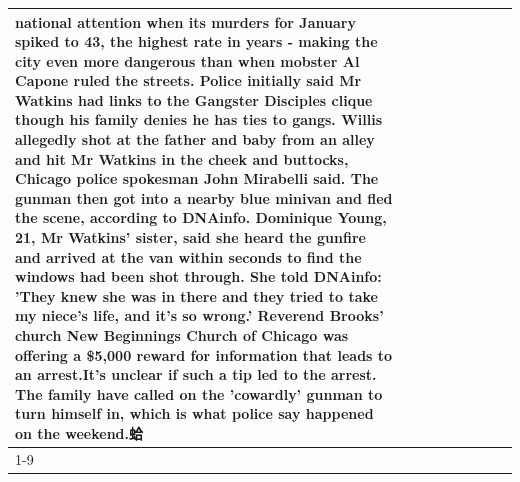 \begin{table}[H]
\begin{tabular}{lllrlllll}
national attention when its murders for January spiked to 43, the highest rate in years - making the city even more dangerous than when mobster Al Capone ruled the streets. Police initially said Mr Watkins had links to the Gangster Disciples clique though his family denies he has ties to gangs. Willis allegedly shot at the father and baby from an alley and hit Mr Watkins in the cheek and buttocks, Chicago police spokesman John Mirabelli said. The gunman then got into a nearby blue minivan and fled the scene, according to DNAinfo. Dominique Young, 21, Mr Watkins' sister, said she heard the gunfire and arrived at the van within seconds to find the windows had been shot through. She told DNAinfo: 'They knew she was in there and they tried to take my niece's life, and it's so wrong.' Reverend Brooks' church New Beginnings Church of Chicago was offering a \$5,000 reward for information that leads to an arrest.It's unclear if such a tip led to the arrest. The family have called on the 'cowardly' gunman to turn himself in, which is what police say happened on the weekend.蛤 \\
\cline{1-9}

\end{tabular}
\end{table}
